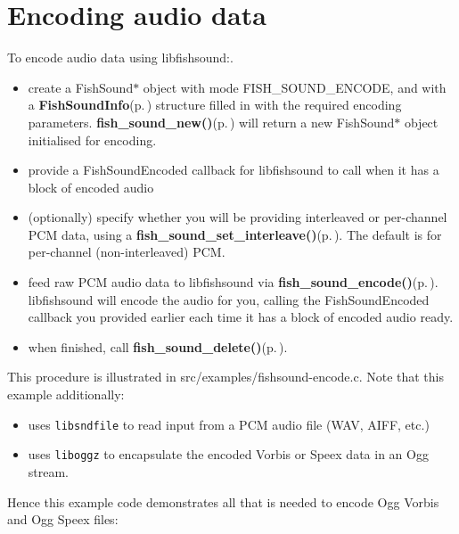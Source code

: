 \section{Encoding audio data}
\label{group__encode}
To encode audio data using libfishsound:.  
\begin{itemize}
\item create a Fish\-Sound$\ast$ object with mode FISH\_\-SOUND\_\-ENCODE, and with a {\bf Fish\-Sound\-Info}{\rm (p.\,\pageref{structFishSoundInfo})} structure filled in with the required encoding parameters. {\bf fish\_\-sound\_\-new()}{\rm (p.\,\pageref{fishsound_8h_a4})} will return a new Fish\-Sound$\ast$ object initialised for encoding.\item provide a Fish\-Sound\-Encoded callback for libfishsound to call when it has a block of encoded audio\item (optionally) specify whether you will be providing interleaved or per-channel PCM data, using a {\bf fish\_\-sound\_\-set\_\-interleave()}{\rm (p.\,\pageref{fishsound_8h_a14})}. The default is for per-channel (non-interleaved) PCM.\item feed raw PCM audio data to libfishsound via {\bf fish\_\-sound\_\-encode()}{\rm (p.\,\pageref{fishsound_8h_a8})}. libfishsound will encode the audio for you, calling the Fish\-Sound\-Encoded callback you provided earlier each time it has a block of encoded audio ready.\item when finished, call {\bf fish\_\-sound\_\-delete()}{\rm (p.\,\pageref{fishsound_8h_a11})}.\end{itemize}


This procedure is illustrated in src/examples/fishsound-encode.c. Note that this example additionally:\begin{itemize}
\item uses {\tt libsndfile} to read input from a PCM audio file (WAV, AIFF, etc.)\item uses {\tt liboggz} to encapsulate the encoded Vorbis or Speex data in an Ogg stream.\end{itemize}


Hence this example code demonstrates all that is needed to encode Ogg Vorbis and Ogg Speex files:



